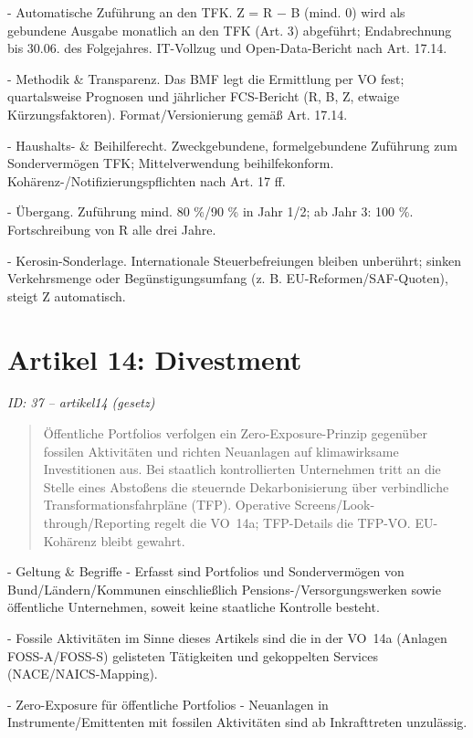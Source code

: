 \documentclass[12pt,a4paper]{scrartcl}
\begin{document}
- Automatische Zuführung an den TFK. Z = R − B (mind. 0) wird als gebundene Ausgabe monatlich an den TFK (Art. 3) abgeführt; Endabrechnung bis 30.06. des Folgejahres. IT-Vollzug und Open-Data-Bericht nach Art. 17.14.

- Methodik \& Transparenz. Das BMF legt die Ermittlung per VO fest; quartalsweise Prognosen und jährlicher FCS-Bericht (R, B, Z, etwaige Kürzungsfaktoren). Format/Versionierung gemäß Art. 17.14.

- Haushalts- \& Beihilferecht. Zweckgebundene, formelgebundene Zuführung zum Sondervermögen TFK; Mittelverwendung beihilfekonform. Kohärenz-/Notifizierungspflichten nach Art. 17 ff.

- Übergang. Zuführung mind. 80 \%/90 \% in Jahr 1/2; ab Jahr 3: 100 \%. Fortschreibung von R alle drei Jahre.

- Kerosin-Sonderlage. Internationale Steuerbefreiungen bleiben unberührt; sinken Verkehrsmenge oder Begünstigungsumfang (z. B. EU-Reformen/SAF-Quoten), steigt Z automatisch.


\section[Artikel 14: Divestment]{Artikel 14: Divestment}
\noindent\textit{ID: 37 -- artikel14 (gesetz)}

\begin{quote}
Öffentliche Portfolios verfolgen ein Zero-Exposure-Prinzip gegenüber fossilen Aktivitäten und richten Neuanlagen auf klimawirksame Investitionen aus. Bei staatlich kontrollierten Unternehmen tritt an die Stelle eines Abstoßens die steuernde Dekarbonisierung über verbindliche Transformationsfahrpläne (TFP). Operative Screens/Look-through/Reporting regelt die VO 14a; TFP-Details die TFP-VO. EU-Kohärenz bleibt gewahrt.
\end{quote}

- Geltung \& Begriffe
- Erfasst sind Portfolios und Sondervermögen von Bund/Ländern/Kommunen einschließlich Pensions-/Versorgungswerken sowie öffentliche Unternehmen, soweit keine staatliche Kontrolle besteht.

- Fossile Aktivitäten im Sinne dieses Artikels sind die in der VO 14a (Anlagen FOSS-A/FOSS-S) gelisteten Tätigkeiten und gekoppelten Services (NACE/NAICS-Mapping).

- Zero-Exposure für öffentliche Portfolios
- Neuanlagen in Instrumente/Emittenten mit fossilen Aktivitäten sind ab Inkrafttreten unzulässig.
\end{document}
